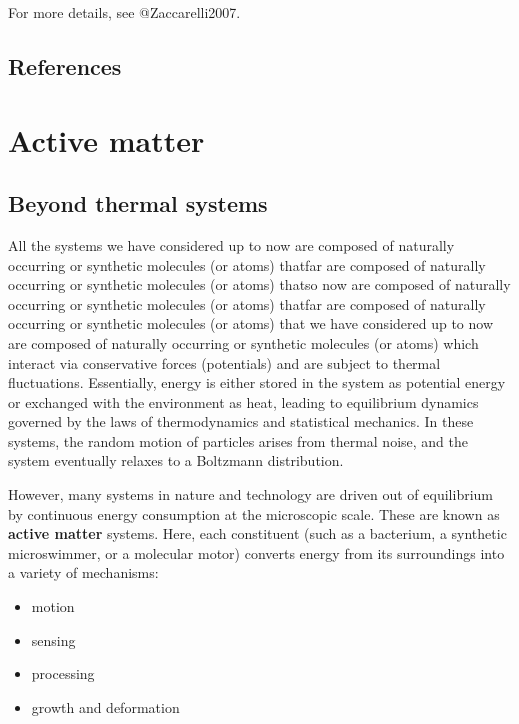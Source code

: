 \documentclass[
  letterpaper,
  enabledeprecatedfontcommands]{report}
\providecommand{\tightlist}{%
  \setlength{\itemsep}{0pt}\setlength{\parskip}{0pt}}
\begin{document}
For more details, see @Zaccarelli2007.

\section*{References}\label{references-4}


\chapter{Active matter}\label{active-matter-1}

\section{Beyond thermal systems}\label{beyond-thermal-systems}

All the systems we have considered up to now are composed of naturally
occurring or synthetic molecules (or atoms) thatfar are composed of
naturally occurring or synthetic molecules (or atoms) thatso now are
composed of naturally occurring or synthetic molecules (or atoms)
thatfar are composed of naturally occurring or synthetic molecules (or
atoms) that we have considered up to now are composed of naturally
occurring or synthetic molecules (or atoms) which interact via
conservative forces (potentials) and are subject to thermal
fluctuations. Essentially, energy is either stored in the system as
potential energy or exchanged with the environment as heat, leading to
equilibrium dynamics governed by the laws of thermodynamics and
statistical mechanics. In these systems, the random motion of particles
arises from thermal noise, and the system eventually relaxes to a
Boltzmann distribution.

However, many systems in nature and technology are driven out of
equilibrium by continuous energy consumption at the microscopic scale.
These are known as \textbf{active matter} systems. Here, each
constituent (such as a bacterium, a synthetic microswimmer, or a
molecular motor) converts energy from its surroundings into a variety of
mechanisms:

\begin{itemize}
\tightlist
\item
  motion
\item
  sensing
\item
  processing
\item
  growth and deformation
\end{itemize}
\end{document}
